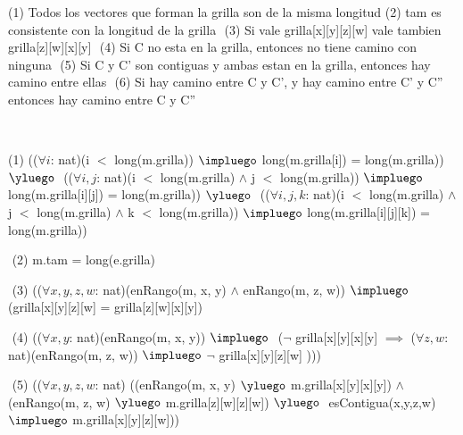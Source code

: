 \begin{Representacion}

$ $\newline

(1) Todos los vectores que forman la grilla son de la misma longitud$ $\newline
(2) tam es consistente con la longitud de la grilla $ $\newline
(3) Si vale grilla[x][y][z][w] vale tambien grilla[z][w][x][y] $ $\newline
(4) Si C no esta en la grilla, entonces no tiene camino con ninguna $ $\newline
(5) Si C y C' son contiguas y ambas estan en la grilla, entonces hay camino entre ellas $ $\newline
(6) Si hay camino entre C y C', y hay camino entre C' y C'' entonces hay camino entre C y C'' $ $\newline


$ $\newline
$ $\newline

(1)
(($\forall i$: nat)(i $<$ long(m.grilla)) $\impluego$ long(m.grilla[i]) = long(m.grilla)) $\yluego$ $ $\newline
(($\forall i, j$: nat)(i $<$ long(m.grilla) $\land$ j $<$ long(m.grilla)) $\impluego$ long(m.grilla[i][j]) = long(m.grilla)) $\yluego$ $ $\newline
(($\forall i, j, k$: nat)(i $<$ long(m.grilla) $\land$ j $<$ long(m.grilla) $\land$ k $<$ long(m.grilla)) $\impluego$ $ $\newline long(m.grilla[i][j][k]) = long(m.grilla))

$ $\newline
(2)
m.tam = long(e.grilla)

$ $\newline
(3) 
(($\forall x, y, z, w$: nat)(enRango(m, x, y) $\land$ enRango(m, z, w)) $\impluego$ (grilla[x][y][z][w] = grilla[z][w][x][y])

$ $\newline
(4)
(($\forall x, y$: nat)(enRango(m, x, y)) $\impluego$ $ $\newline 
($\neg$ grilla[x][y][x][y] $\implies$
($\forall z, w$: nat)(enRango(m, z, w)) $\impluego$
$\neg$ grilla[x][y][z][w] ))) 

$ $\newline
(5)
(($\forall x, y, z, w$: nat)$ $\newline
((enRango(m, x, y) $\yluego$ m.grilla[x][y][x][y]) $\land$ $ $\newline
(enRango(m, z, w) $\yluego$ m.grilla[z][w][z][w]) $\yluego$ $ $\newline
esContigua(x,y,z,w) $\impluego$ m.grilla[x][y][z][w]))



\end{Representacion}
